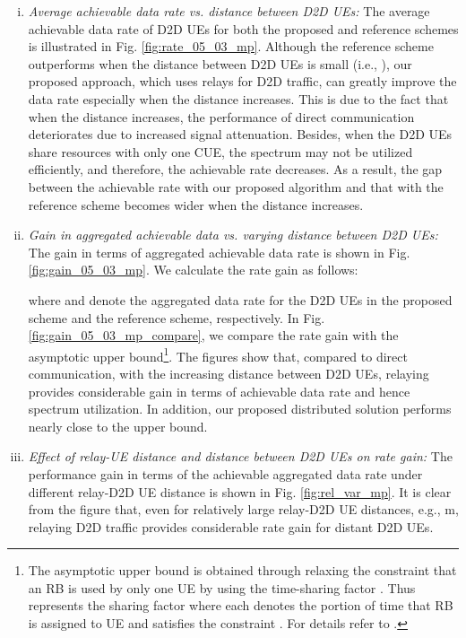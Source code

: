 \documentclass[twocolumn,10pt]{IEEEtran}
\begin{document}
\begin{enumerate}[(i)]
\item \textit{Average achievable data rate vs. distance between D2D UEs:} The average achievable data rate of D2D UEs for both the proposed and reference schemes is illustrated in Fig. \ref{fig:rate_05_03_mp}. Although the reference scheme outperforms when the distance between D2D UEs is small (i.e., ), our proposed approach, which uses relays for D2D traffic, can greatly improve the data rate especially when the distance increases. This is due to the fact that when the distance increases, the performance of direct communication deteriorates due to increased signal attenuation. Besides, when the D2D UEs share resources with only one CUE, the spectrum may not be utilized efficiently, and therefore, the achievable rate decreases. As a result, the gap between the achievable rate with our proposed algorithm and that with the reference scheme becomes wider when the distance increases.

\item \textit{Gain in aggregated achievable data vs. varying distance between D2D UEs:} The gain in terms of aggregated achievable data rate is shown in Fig. \ref{fig:gain_05_03_mp}. We calculate the rate gain as follows: 
 
where  and   denote the aggregated data rate for the D2D UEs in the proposed scheme and the reference scheme, respectively. In Fig. \ref{fig:gain_05_03_mp_compare}, we compare the rate gain with the asymptotic upper bound\footnote{The asymptotic upper bound is obtained through relaxing the constraint that an RB is used by only one UE by using the time-sharing factor \cite{relax-con-1}. Thus  represents the sharing factor where each  denotes the portion of time that RB  is assigned to UE  and satisfies the constraint . For details refer to \cite{d2d_our_paper}.}. The figures show that, compared to direct communication, with the increasing distance between D2D UEs, relaying provides considerable gain in terms of achievable data rate and hence spectrum utilization. In addition, our proposed distributed solution performs nearly close to the upper bound.

\item \textit{Effect of relay-UE distance and distance between D2D UEs on rate gain:} The performance gain in terms of the achievable aggregated data rate under different relay-D2D UE distance is shown in Fig. \ref{fig:rel_var_mp}. It is clear from the figure that, even for relatively large relay-D2D UE distances, e.g.,  m, relaying D2D traffic provides considerable rate gain for distant D2D UEs.



\end{enumerate}
\end{document}
